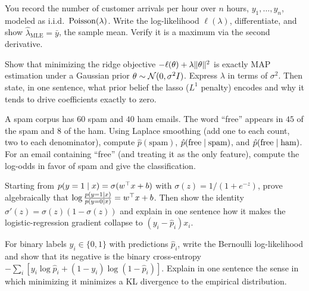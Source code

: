 \begin{exercise}
You record the number of customer arrivals per hour over $n$ hours,
$y_1,\dots,y_n$, modeled as i.i.d.\ $\operatorname{Poisson}(\lambda)$. Write the log-likelihood
$\ell(\lambda)$, differentiate, and show $\hat\lambda_{\text{MLE}} = \bar y$, the
sample mean. Verify it is a maximum via the second derivative.
\end{exercise}

\begin{exercise}
Show that minimizing the ridge objective
$-\ell(\theta) + \lambda\lVert\theta\rVert^2$ is exactly MAP estimation under a
Gaussian prior $\theta\sim\mathcal{N}(0,\sigma^2 I)$. Express $\lambda$ in terms of
$\sigma^2$. Then state, in one sentence, what prior belief the lasso ($L^1$
penalty) encodes and why it tends to drive coefficients exactly to zero.
\end{exercise}

\begin{exercise}
A spam corpus has $60$ spam and $40$ ham emails. The word ``free'' appears in
$45$ of the spam and $8$ of the ham. Using Laplace smoothing (add one to each
count, two to each denominator), compute $\hat p(\text{spam})$,
$\hat p(\text{free}\mid\text{spam})$, and
$\hat p(\text{free}\mid\text{ham})$. For an email containing ``free'' (and
treating it as the only feature), compute the log-odds in favor of spam and give
the classification.
\end{exercise}

\begin{exercise}
Starting from $p(y=1\mid x) = \sigma(w^\top x + b)$ with
$\sigma(z) = 1/(1+e^{-z})$, prove algebraically that
$\log\frac{p(y=1\mid x)}{p(y=0\mid x)} = w^\top x + b$. Then show the identity
$\sigma'(z) = \sigma(z)(1-\sigma(z))$ and explain in one sentence how it makes the
logistic-regression gradient collapse to $(y_i - \hat p_i)x_i$.
\end{exercise}

\begin{exercise}
For binary labels $y_i\in\{0,1\}$ with predictions $\hat p_i$, write the Bernoulli
log-likelihood and show that its negative is the binary cross-entropy
$-\sum_i[y_i\log\hat p_i + (1-y_i)\log(1-\hat p_i)]$. Explain in one sentence
the sense in which minimizing it minimizes a KL divergence to the empirical
distribution.
\end{exercise}

